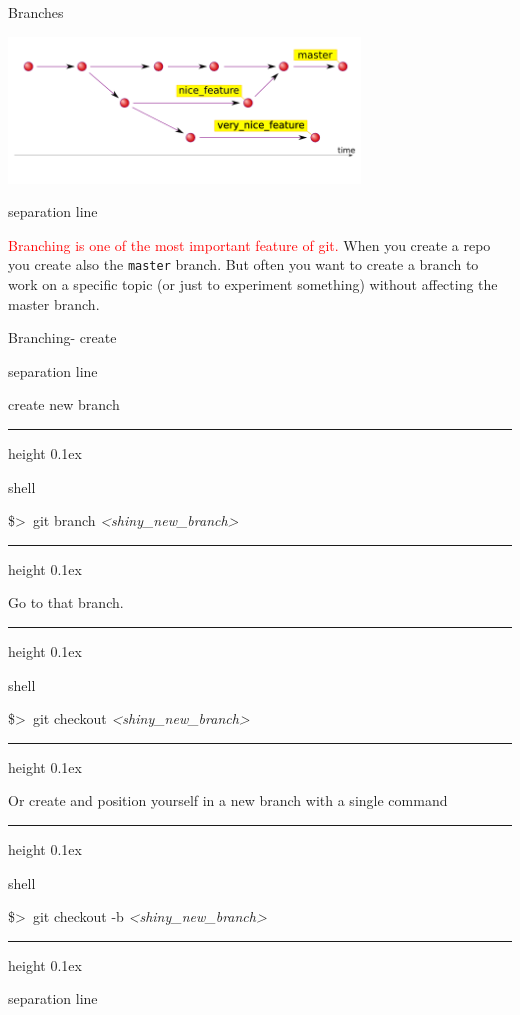 \documentclass[hyperref={colorlinks}]{beamer}
\newenvironment{shell}{%
\footnotesize\flushleft\hrule height 0.1ex
\tt\begin{beamercolorbox}[sep=1ex,left]{shell}%
}{%
\end{beamercolorbox}
\hrule height 0.1ex
\endflushleft\par
}
\newcommand*{\psone}[1][ant]{\$>~}
\newcommand*{\var}[1]{{\it<#1>}}
\newcommand{\titleline}[1][0.025cm]{%
\begin{beamercolorbox}[wd=\paperwidth,ht=#1,center]{separation line}%
\end{beamercolorbox}%
}
\begin{document}
\begin{frame}{Branches}
\centerline{\includegraphics[width=0.7\textwidth]{figures/git-history}}

\titleline

\textcolor{red}{Branching is one of the most important feature of git.} 
When you create a repo you create also the \alert{\texttt{master}} branch. But often you want to create a branch to work on a specific topic (or just to experiment something) without affecting the master branch.
\end{frame}
\begin{frame}{Branching- create}
\titleline
create new branch
\begin{shell}
\psone git branch \var{shiny_new_branch} \\
\end{shell}
Go to that branch.
\begin{shell}
\psone git checkout \var{shiny_new_branch}
\end{shell}
Or create and position yourself in a new branch with a single command
\begin{shell}
\psone git checkout -b \var{shiny_new_branch}
\end{shell}
\titleline
\end{frame}
\end{document}
